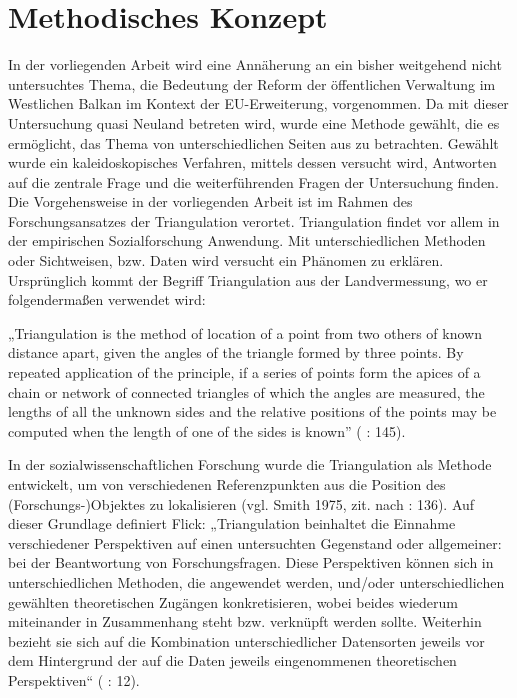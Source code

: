 \section{Methodisches Konzept}
In der vorliegenden Arbeit wird eine Annäherung an ein bisher weitgehend nicht untersuchtes Thema, die Bedeutung der Reform der öffentlichen Verwaltung im Westlichen Balkan im Kontext der EU-Erweiterung, vorgenommen. Da mit dieser Untersuchung quasi Neuland betreten wird, wurde eine Methode gewählt, die es ermöglicht, das Thema von unterschiedlichen Seiten aus zu betrachten. Gewählt wurde ein kaleidoskopisches Verfahren, mittels dessen versucht wird, Antworten auf die zentrale Frage und die weiterführenden Fragen der Untersuchung finden. Die Vorgehensweise in der vorliegenden Arbeit ist im Rahmen des Forschungsansatzes der Triangulation verortet. Triangulation findet vor allem in der empirischen Sozialforschung Anwendung. Mit unterschiedlichen Methoden oder Sichtweisen, bzw. Daten wird versucht ein Phänomen zu erklären. Ursprünglich kommt der Begriff Triangulation aus der Landvermessung, wo er folgendermaßen verwendet wird:\par
„Triangulation is the method of location of a point from two others of known distance apart, given the angles of the triangle formed by three points. By repeated application of the principle, if a series of points form the apices of a chain or network of connected triangles of which the angles are measured, the lengths of all the unknown sides and the relative positions of the points may be computed when the length of one of the sides is known” (\cite{clark} : 145).\par
In der sozialwissenschaftlichen Forschung wurde die Triangulation als Methode entwickelt, um von verschiedenen Referenzpunkten aus die Position des (Forschungs-)Objektes zu lokalisieren (vgl. Smith 1975, zit. nach \cite{jick} : 136). Auf dieser Grundlage definiert Flick: „Triangulation beinhaltet die Einnahme verschiedener Perspektiven auf einen untersuchten Gegenstand oder allgemeiner: bei der Beantwortung von Forschungsfragen. Diese Perspektiven können sich in unterschiedlichen Methoden, die angewendet werden, und/oder unterschiedlichen gewählten theoretischen Zugängen konkretisieren, wobei beides wiederum miteinander in Zusammenhang steht bzw. verknüpft werden sollte. Weiterhin bezieht sie sich auf die Kombination unterschiedlicher Datensorten jeweils vor dem Hintergrund der auf die Daten jeweils eingenommenen theoretischen Perspektiven“ (\cite{flick08} : 12).\par

